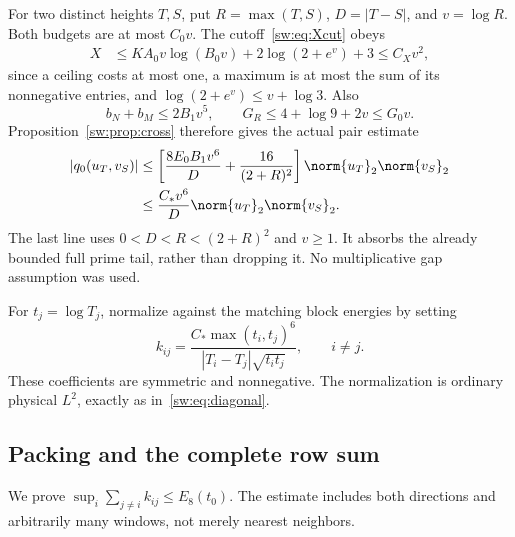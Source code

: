 \documentclass[11pt,a4paper]{article}
\numberwithin{equation}{section}
\theoremstyle{definition}\newtheorem{definition}[theorem]{Definition}
\theoremstyle{remark}\newtheorem{remark}[theorem]{Remark}
\begin{document}
For two distinct heights $T,S$, put $R=\max(T,S)$, $D=|T-S|$, and $v=\log R$. Both budgets are at most $C_0v$. The cutoff~\eqref{sw:eq:Xcut} obeys
\begin{align}\label{sw:eq:Xbound}
 X&\le KA_0v\log(B_0v)+2\log(2+e^v)+3
 \le C_Xv^2,
\end{align}
since a ceiling costs at most one, a maximum is at most the sum of its nonnegative entries, and $\log(2+e^v)\le v+\log3$. Also
\[
 b_N+b_M\le2B_1v^5,\qquad
 G_R\le4+\log9+2v\le G_0v.
\]
Proposition~\ref{sw:prop:cross} therefore gives the actual pair estimate
\begin{align}\label{sw:eq:reduced-cross}
 |q_0(u_T,v_S)|
 &\le\left[\frac{8E_0B_1v^6}{D}+\frac{16}{(2+R)^2}\right]
                    \norm{u_T}_2\norm{v_S}_2\\
 &\le\frac{C_*v^6}{D}\norm{u_T}_2\norm{v_S}_2.\nonumber
\end{align}
The last line uses $0<D<R<(2+R)^2$ and $v\ge1$. It absorbs the already bounded full prime tail, rather than dropping it. No multiplicative gap assumption was used.

For $t_j=\log T_j$, normalize against the matching block energies by setting
\begin{equation}\label{sw:eq:kij}
 k_{ij}=\frac{C_*\max(t_i,t_j)^6}
                {|T_i-T_j|\sqrt{t_it_j}},\qquad i\ne j.
\end{equation}
These coefficients are symmetric and nonnegative. The normalization is ordinary physical $L^2$, exactly as in~\eqref{sw:eq:diagonal}.

\subsection{Packing and the complete row sum}\label{sw:sec:packing}
We prove $\sup_i\sum_{j\ne i}k_{ij}\le E_8(t_0)$. The estimate includes both directions and arbitrarily many windows, not merely nearest neighbors.
\end{document}
